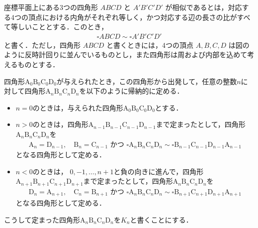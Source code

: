 座標平面上にある3つの四角形 $ABCD$ と $A'B'C'D'$ が相似であるとは，対応する4つの頂点における内角がそれぞれ等しく，かつ対応する辺の長さの比がすべて等しいこととする．このとき，
\begin{align}
  \square ABCD \sim \square A'B'C'D'
\end{align}
と書く．ただし，四角形 $ABCD$ と書くときには，4つの頂点 $A, B, C, D$ は図のように反時計回りに並んでいるものとし，また四角形は周および内部を込めて考えるものとする．

四角形$\text{A}_0 \text{B}_0 \text{C}_0 \text{D}_0$が与えられたとき，この四角形から出発して，任意の整数$n$に対して四角形$\text{A}_n \text{B}_n \text{C}_n \text{D}_n$を以下のように帰納的に定める．

\begin{itemize}
  \item[(I)] $n = 0$のときは，与えられた四角形$\text{A}_0 \text{B}_0 \text{C}_0 \text{D}_0$とする．
  \item[(II)] $n > 0$のときは，四角形$\text{A}_{n-1} \text{B}_{n-1} \text{C}_{n-1} \text{D}_{n-1}$まで定まったとして，四角形$\text{A}_n \text{B}_n \text{C}_n \text{D}_n$を
        \begin{align}
          \text{A}_n = \text{D}_{n-1}, \quad \text{B}_n = \text{C}_{n-1} \text{ かつ } \square\text{A}_n \text{B}_n \text{C}_n \text{D}_n \sim \square \text{B}_{n-1} \text{C}_{n-1} \text{D}_{n-1} \text{A}_{n-1}
        \end{align}
        となる四角形として定める．
  \item[(III)] $n < 0$のときは， $0, -1, \dots, n+1$と負の向きに進んで，四角形$\text{A}_{n+1} \text{B}_{n+1} \text{C}_{n+1} \text{D}_{n+1}$まで定まったとして，四角形$\text{A}_n \text{B}_n \text{C}_n \text{D}_n$を
        \begin{align}
          \text{D}_n = \text{A}_{n+1}, \quad \text{C}_n = \text{B}_{n+1} \text{ かつ } \square \text{A}_n \text{B}_n \text{C}_n \text{D}_n \sim \square \text{B}_{n+1} \text{C}_{n+1} \text{D}_{n+1} \text{A}_{n+1}
        \end{align}
        となる四角形として定める．
\end{itemize}

こうして定まった四角形$\text{A}_n \text{B}_n \text{C}_n \text{D}_n$を$K_n$と書くことにする．

